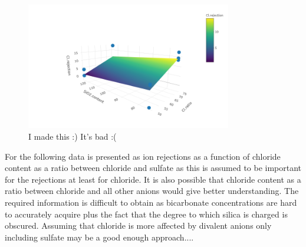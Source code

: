 \begin{figure}[H]
    \centering
    \includegraphics[width=0.8\textwidth]{Billeder/data/SPRR/cl_ratio_sio2_conc_cl_rejection_3d.png}
    \caption{I made this :) It's bad :(}
    \label{fig:3d plot}
\end{figure}
For the following data is presented as ion rejections as a function of chloride content as a ratio between chloride and sulfate as this is assumed to be important for the rejections at least for chloride.
It is also possible that chloride content as a ratio between chloride and all other anions would give better understanding.
The required information is difficult to obtain as bicarbonate concentrations are hard to accurately acquire plus the fact that the degree to which silica is charged is obscured.
Assuming that chloride is more affected by divalent anions only including sulfate may be a good enough approach....  


